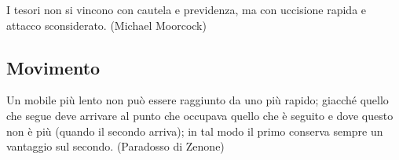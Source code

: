 \bigskip

\begin{enfasi}
I tesori non si vincono con cautela e previdenza, ma con uccisione rapida e attacco sconsiderato. (Michael Moorcock)
\end{enfasi}


\pagebreak

\subsection{Movimento}\label{movimento}

\begin{enfasi}{Un mobile più lento non può essere raggiunto da uno più rapido; giacché quello che segue deve arrivare al punto che occupava quello che è seguito e dove questo non è più (quando il secondo arriva); in tal modo il primo conserva sempre un vantaggio sul secondo. (Paradosso di Zenone)}
\end{enfasi}

